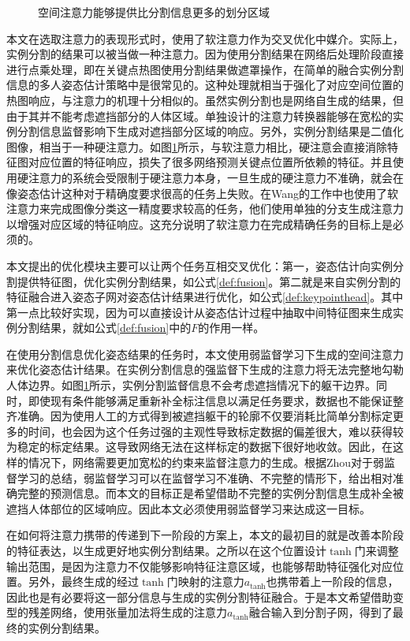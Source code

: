 \begin{figure}[h]
\begin{minipage}{0.05\linewidth}
		\vskip1cm
	\end{minipage}
	\caption{空间注意力能够提供比分割信息更多的划分区域}
	\label{fig:attention_mask}
\end{figure}

本文在选取注意力的表现形式时，使用了软注意力作为交叉优化中媒介。实际上，实例分割的结果可以被当做一种注意力。因为使用分割结果在网络后处理阶段直接进行点乘处理，即在关键点热图使用分割结果做遮罩操作，在简单的融合实例分割信息的多人姿态估计策略中是很常见的。这种处理就相当于强化了对应空间位置的热图响应，与注意力的机理十分相似的。虽然实例分割也是网络自生成的结果，但由于其并不能考虑遮挡部分的人体区域。单独设计的注意力转换器能够在宽松的实例分割信息监督影响下生成对遮挡部分区域的响应。另外，实例分割结果是二值化图像，相当于一种硬注意力。如图\ref{fig:attention_mask}所示，与软注意力相比，硬注意会直接消除特征图对应位置的特征响应，损失了很多网络预测关键点位置所依赖的特征。并且使用硬注意力的系统会受限制于硬注意力本身，一旦生成的硬注意力不准确，就会在像姿态估计这种对于精确度要求很高的任务上失败。在Wang的工作\cite{wang2017residual}中也使用了软注意力来完成图像分类这一精度要求较高的任务，他们使用单独的分支生成注意力以增强对应区域的特征响应。这充分说明了软注意力在完成精确任务的目标上是必须的。

本文提出的优化模块主要可以让两个任务互相交叉优化：第一，姿态估计向实例分割提供特征图，优化实例分割结果，如公式\eqref{def:fusion}。第二就是来自实例分割的特征融合进入姿态子网对姿态估计结果进行优化，如公式\eqref{def:keypointhead}。其中第一点比较好实现，因为可以直接设计从姿态估计过程中抽取中间特征图来生成实例分割结果，就如公式\eqref{def:fusion}中的$F$的作用一样。

在使用分割信息优化姿态结果的任务时，本文使用弱监督学习下生成的空间注意力来优化姿态估计结果。在实例分割信息的强监督下生成的注意力将无法完整地勾勒人体边界。如图\ref{fig:attention_mask}所示，实例分割监督信息不会考虑遮挡情况下的躯干边界。同时，即使现有条件能够满足重新补全标注信息以满足任务要求，数据也不能保证整齐准确。因为使用人工的方式得到被遮挡躯干的轮廓不仅要消耗比简单分割标定更多的时间，也会因为这个任务过强的主观性导致标定数据的偏差很大，难以获得较为稳定的标定结果。这导致网络无法在这样标定的数据下很好地收敛。因此，在这样的情况下，网络需要更加宽松的约束来监督注意力的生成。根据Zhou对于弱监督学习的总结\cite{10.1093/nsr/nwx106}，弱监督学习可以在监督学习不准确、不完整的情形下，给出相对准确完整的预测信息。而本文的目标正是希望借助不完整的实例分割信息生成补全被遮挡人体部位的区域响应。因此本文必须使用弱监督学习来达成这一目标。

在如何将注意力携带的传递到下一阶段的方案上，本文的最初目的就是改善本阶段的特征表达，以生成更好地实例分割结果。之所以在这个位置设计$\tanh$门来调整输出范围，是因为注意力不仅能够影响特征注意区域，也能够帮助特征强化对应位置。另外，最终生成的经过$\tanh$门映射的注意力$a_{\tanh}$也携带着上一阶段的信息，因此也是有必要将这一部分信息与生成的实例分割特征融合。于是本文希望借助变型的残差网络，使用张量加法将生成的注意力$a_{\tanh}$融合输入到分割子网，得到了最终的实例分割结果。


